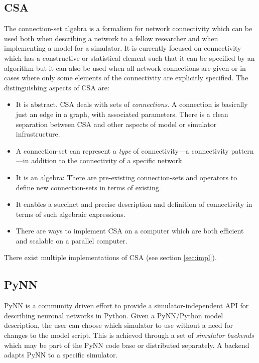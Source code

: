 \documentclass{frontiersSCNS} %
\begin{document}
\subsection{CSA}
The connection-set algebra \citep[CSA;][]{djurfeldt12} is a formalism
for network connectivity which can be used both when describing a
network to a fellow researcher and when implementing a model for a
simulator.  It is currently focused on connectivity which has a
constructive or statistical element such that it can be specified by
an algorithm but it can also be used when all network connections are
given or in cases where only some elements of the connectivity are
explicitly specified. The distinguishing aspects of CSA are:
\begin{itemize}
\item It is abstract. CSA deals with sets of \emph{connections}. A
  connection is basically just an edge in a graph, with associated
  parameters. There is a clean separation between CSA and other
  aspects of model or simulator infrastructure.
\item A connection-set can represent a \emph{type} of
  connectivity---a connectivity pattern---in addition to the connectivity
  of a specific network.
\item It is an algebra: There are pre-existing connection-sets and
  operators to define new connection-sets in terms of existing.
\item It enables a succinct and precise description and definition of
  connectivity in terms of such algebraic expressions.
\item There are ways to implement CSA on a computer which are both
  efficient and scalable on a parallel computer.
\end{itemize}
There exist multiple implementations of CSA (see section
\ref{sec:impl}).

\subsection{PyNN}\label{sec:pynn}

PyNN \citep[\url{http://www.neuralensemble.org/PyNN};][]{Davison09} is
a community driven effort to provide a simulator-independent API for
describing neuronal networks in Python. Given a PyNN/Python model
description, the user can choose which simulator to use without a need
for changes to the model script. This is achieved through a set of
\emph{simulator backends} which may be part of the PyNN code base or
distributed separately. A backend adapts PyNN to a specific simulator.
\end{document}
